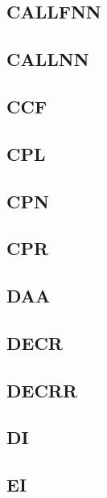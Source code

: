 \documentclass[a4paper]{article}
\begin{document}
\subsection{CALLFNN}
\sailfclCALLFNNdecodeTwoFour
\sailfclCALLFNNassembly
\sailfclCALLFNNexecute
\subsection{CALLNN}
\sailfclCALLNNmakeLsbimmdecodeTwoFour
\sailfclCALLNNassembly
\sailfclCALLNNexecute
\subsection{CCF}
\sailfclCCFdecode
\sailfclCCFassembly
\sailfclCCFexecute
\subsection{CPL}
\sailfclCPLdecode
\sailfclCPLassembly
\sailfclCPLexecute
\subsection{CPN}
\sailfclCPNimmdecodeOneSix
\sailfclCPNassembly
\sailfclCPNexecute
\subsection{CPR}
\sailfclCPRrdecode
\sailfclCPRassembly
\sailfclCPRexecute
\subsection{DAA}
\sailfclDAAdecode
\sailfclDAAassembly
\sailfclDAAexecute
\subsection{DECR}
\sailfclDECRrdecode
\sailfclDECRRrrdecode
\sailfclDECRassembly
\sailfclDECRRassembly
\sailfclDECRexecute
\sailfclDECRRexecute
\subsection{DECRR}
\sailfclDECRRrrdecode
\sailfclDECRRassembly
\sailfclDECRRexecute
\subsection{DI}
\sailfclDIdecode
\sailfclDIassembly
\sailfclDIexecute
\subsection{EI}
\sailfclEIdecode
\sailfclEIassembly
\sailfclEIexecute
\end{document}

